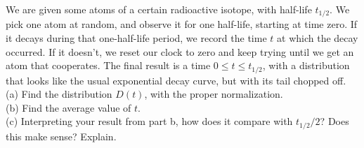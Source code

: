 We are given some atoms of a certain radioactive isotope, with
half-life $t_{1/2}$. We pick one atom at random, and observe it
for one half-life, starting at time zero. If it decays during
that one-half-life period, we record the time $t$ at which the
decay occurred. If it doesn't, we reset our clock to zero and keep
trying until we get an atom that cooperates. The final result
is a time $0\le t\le t_{1/2}$, with a distribution that looks
like the usual exponential decay curve, but with its tail chopped
off.\\
(a) Find the distribution $D(t)$, with the proper normalization.\answercheck\hwendpart\\
(b) Find the average value of $t$.\answercheck\hwendpart\\
(c) Interpreting your result from part b, how does it compare
with $t_{1/2}/2$? Does this make sense? Explain.
